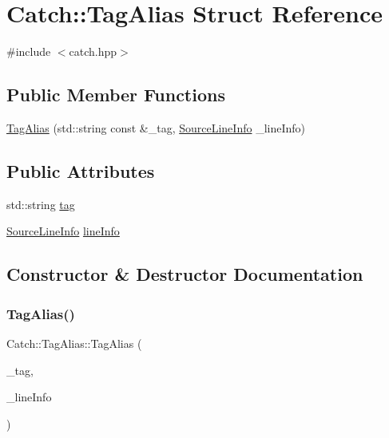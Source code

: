 \hypertarget{struct_catch_1_1_tag_alias}{}\section{Catch\+:\+:Tag\+Alias Struct Reference}
\label{struct_catch_1_1_tag_alias}


{\ttfamily \#include $<$catch.\+hpp$>$}

\subsection*{Public Member Functions}
\begin{DoxyCompactItemize}
\item 
\mbox{\hyperlink{struct_catch_1_1_tag_alias_ae5a030edfbc8e37f28310d4ca599396c}{Tag\+Alias}} (std\+::string const \&\+\_\+tag, \mbox{\hyperlink{struct_catch_1_1_source_line_info}{Source\+Line\+Info}} \+\_\+line\+Info)
\end{DoxyCompactItemize}
\subsection*{Public Attributes}
\begin{DoxyCompactItemize}
\item 
std\+::string \mbox{\hyperlink{struct_catch_1_1_tag_alias_a950183883ab17c90d0fab16b966b6e2d}{tag}}
\item 
\mbox{\hyperlink{struct_catch_1_1_source_line_info}{Source\+Line\+Info}} \mbox{\hyperlink{struct_catch_1_1_tag_alias_a2f51fe0b3c052561275d26b6eb88f702}{line\+Info}}
\end{DoxyCompactItemize}


\subsection{Constructor \& Destructor Documentation}
\mbox{\label{struct_catch_1_1_tag_alias_ae5a030edfbc8e37f28310d4ca599396c}} 
\subsubsection{\texorpdfstring{Tag\+Alias()}{TagAlias()}}
{\footnotesize\ttfamily Catch\+::\+Tag\+Alias\+::\+Tag\+Alias (\begin{DoxyParamCaption}\item[{std\+::string const \&}]{\+\_\+tag,  }\item[{\mbox{\hyperlink{struct_catch_1_1_source_line_info}{Source\+Line\+Info}}}]{\+\_\+line\+Info }\end{DoxyParamCaption})\hspace{0.3cm}{\ttfamily [inline]}}




